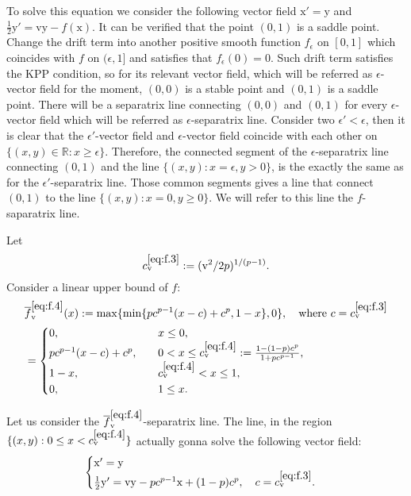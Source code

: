 \documentclass[12pt,a4paper]{amsart}
\numberwithin{equation}{section}
\theoremstyle{plain}
\theoremstyle{remark}
\begin{document}
To solve this equation we consider the following vector field $\mathrm x' = \mathrm y$ and $\frac{1}{2}\mathrm y' =\mathrm v \mathrm y - f(\mathrm x)$.
It can be verified that the point $(0,1)$ is a saddle point.
Change the drift term into another positive smooth function $f_\epsilon$ on $[0,1]$ which coincides with $f$ on $(\epsilon, 1]$ and satisfies that $f_\epsilon(0) = 0$.
Such drift term satisfies the KPP condition, so for its relevant vector field, which will be referred as $\epsilon$-vector field for the moment, $(0,0)$ is a stable point and $(0,1)$ is a saddle point. 
There will be a separatrix line connecting $(0,0)$ and $(0,1)$ for every $\epsilon$-vector field which will be referred as $\epsilon$-separatrix line.
Consider two $\epsilon' < \epsilon$, then it is clear that the $\epsilon'$-vector field and $\epsilon$-vector field coincide with each other on $\{(x,y)\in \mathbb R: x \geq \epsilon\}$. 
Therefore, the connected segment of the $\epsilon$-separatrix line connecting $(0,1)$ and the line $\{(x,y): x = \epsilon, y>0\}$, is the exactly the same as for the $\epsilon'$-separatrix line. 
Those common segments gives a line that connect $(0,1)$ to the line $\{(x,y): x = 0, y\geq 0\}$. 
We will refer to this line the $f$-saparatrix line.

Let
\begin{equation} \label{eq:f.3}
c_\mathrm v^{\eqref{eq:f.3}} := (\mathrm v^2/2p)^{1/(p-1)}. 
\end{equation}
Consider a linear upper bound of $f$:
\begin{align} \label{eq:f.4}
&\overline{f}_{\mathrm v}^{\eqref{eq:f.4}}(x) := \max\{\min\{pc^{p-1}(x-c) + c^p, 1 - x\}, 0\}, \quad \text{where $c = c_\mathrm v^{\eqref{eq:f.3}}$}
\\&=\begin{cases}
0, & \quad x\leq 0,\\
pc^{p-1}(x-c)+c^p,&\quad 0 < x \leq c^{\eqref{eq:f.4}}_\mathrm v :=\frac{1 - (1- p)c^p}{1+pc^{p-1}},\\
1-x,&\quad  c^{\eqref{eq:f.4}}_\mathrm v < x\leq 1,\\
0, & \quad 1 \leq x.
\end{cases}
\end{align}

Let us consider the $\overline{f}_\mathrm v^{\eqref{eq:f.4}}$-separatrix line. 
The line, in the region $\{(x,y): 0 \leq x < c_\mathrm v^{\eqref{eq:f.4}} \}$ actually gonna solve the following vector field:
\begin{align} \label{eq:f.5}
\begin{cases}
\mathrm x'=\mathrm y \\
\frac{1}{2}\mathrm y' = \mathrm v \mathrm y -  pc^{p-1}\mathrm x + (1-p)c^{p}, \quad c = c_\mathrm v^{\eqref{eq:f.3}}.
\end{cases}
\end{align}
\end{document}
